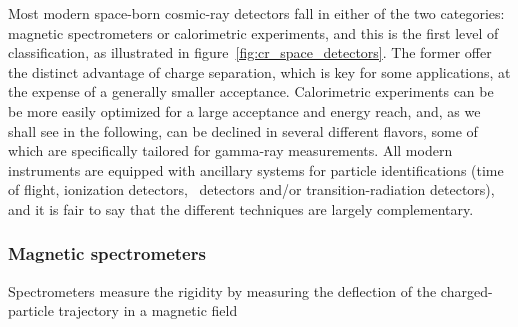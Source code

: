 Most modern space-born cosmic-ray detectors fall in either of the two categories:
magnetic spectrometers or calorimetric experiments, and this is the first level of classification, as
illustrated in figure~\ref{fig:cr_space_detectors}. The former offer the distinct
advantage of charge separation, which is key for some applications, at the expense
of a generally smaller acceptance. Calorimetric experiments can be be more easily optimized for a large
acceptance and energy reach, and, as we shall see in the following, can be declined
in several different flavors, some of which are specifically tailored for gamma-ray
measurements. All modern instruments are equipped with ancillary systems for particle
identifications (time of flight, ionization detectors, \cherenkov\ detectors and/or
transition-radiation detectors), and it is fair to say that the different techniques
are largely complementary.


\subsubsection{Magnetic spectrometers}

Spectrometers measure the rigidity by measuring the deflection of the charged-particle
trajectory in a magnetic field

